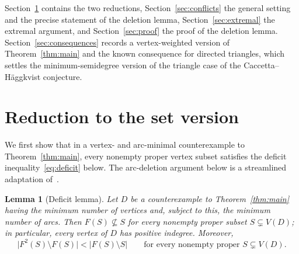 \documentclass[11pt]{amsart}
\newtheorem{lemma}[theorem]{Lemma}
\theoremstyle{remark}
\newcommand{\abs}[1]{\lvert #1\rvert}
\begin{document}
Section~\ref{sec:reduction} contains the two reductions, Section~\ref{sec:conflicts} the general setting and the precise statement of the deletion lemma, Section~\ref{sec:extremal} the extremal argument, and Section~\ref{sec:proof} the proof of the deletion lemma. Section~\ref{sec:consequences} records a vertex-weighted version of Theorem~\ref{thm:main} and the known consequence for directed triangles, which settles the minimum-semidegree version of the triangle case of the Caccetta--H\"aggkvist conjecture.

\section{Reduction to the set version}\label{sec:reduction}

We first show that in a vertex- and arc-minimal counterexample to Theorem~\ref{thm:main}, every nonempty proper vertex subset satisfies the deficit inequality~\eqref{eq:deficit} below. The arc-deletion argument below is a streamlined adaptation of~\cite[Lemma~4]{Seacrest2019}.

\begin{lemma}[Deficit lemma]\label{lem:deficit}
Let $D$ be a counterexample to Theorem~\ref{thm:main} having the minimum number of vertices and, subject to this, the minimum number of arcs. Then $F(S)\not\subseteq S$ for every nonempty proper subset $S\subsetneq V(D)$; in particular, every vertex of $D$ has positive indegree. Moreover,
\begin{equation}\label{eq:deficit}
  \abs{F^2(S)\setminus F(S)}<\abs{F(S)\setminus S}
  \qquad\text{for every nonempty proper }S\subsetneq V(D).
\end{equation}
\end{lemma}
\end{document}
